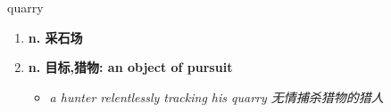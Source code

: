 
\begin{frame}
{\huge quarry}
\begin{center}
\begin{enumerate}\Large
  \item \textbf{n. 采石场}
  \item \textbf{n. 目标,猎物: an object of pursuit}
  \begin{itemize}
    \item \em{\Large{a hunter relentlessly tracking his quarry 无情捕杀猎物的猎人}}
  \end{itemize}
\end{enumerate}
\end{center}
\end{frame}
